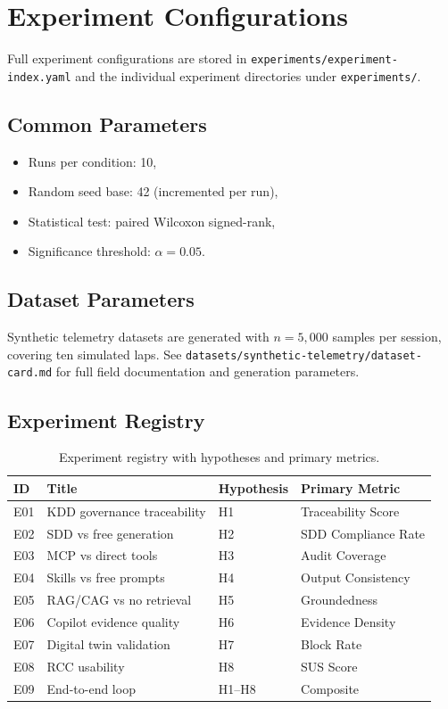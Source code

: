 \section{Experiment Configurations}
\label{app:experiment-configurations}

Full experiment configurations are stored in
\texttt{experiments/experiment-index.yaml} and the individual experiment
directories under \texttt{experiments/}.

\subsection{Common Parameters}

\begin{itemize}
  \item Runs per condition: 10,
  \item Random seed base: 42 (incremented per run),
  \item Statistical test: paired Wilcoxon signed-rank,
  \item Significance threshold: $\alpha = 0.05$.
\end{itemize}

\subsection{Dataset Parameters}

Synthetic telemetry datasets are generated with $n = 5{,}000$ samples per
session, covering ten simulated laps. See
\texttt{datasets/synthetic-telemetry/dataset-card.md} for full field
documentation and generation parameters.

\subsection{Experiment Registry}

\begin{table}[ht]
\centering
\caption{Experiment registry with hypotheses and primary metrics.}
\label{tab:experiment-registry}
\begin{tabular}{llll}
\toprule
ID & Title & Hypothesis & Primary Metric \\
\midrule
E01 & KDD governance traceability & H1 & Traceability Score \\
E02 & SDD vs free generation & H2 & SDD Compliance Rate \\
E03 & MCP vs direct tools & H3 & Audit Coverage \\
E04 & Skills vs free prompts & H4 & Output Consistency \\
E05 & RAG/CAG vs no retrieval & H5 & Groundedness \\
E06 & Copilot evidence quality & H6 & Evidence Density \\
E07 & Digital twin validation & H7 & Block Rate \\
E08 & RCC usability & H8 & SUS Score \\
E09 & End-to-end loop & H1--H8 & Composite \\
\bottomrule
\end{tabular}
\end{table}
